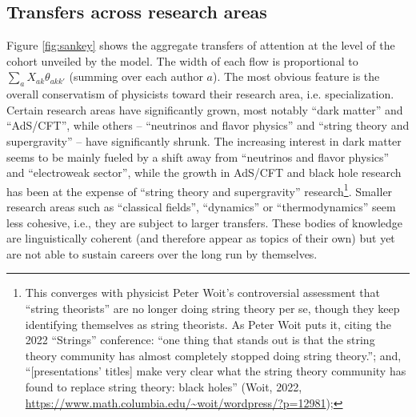 \documentclass{article}
\begin{document}
 \subsection{\label{sec:macro}Transfers across research areas}

Figure \ref{fig:sankey} shows the aggregate transfers of attention at the level of the cohort unveiled by the model. The width of each flow is proportional to $\sum_a X_{ak}\theta_{akk'}$ (summing over each author $a$). The most obvious feature is the overall conservatism of physicists toward their research area, i.e. specialization. Certain research areas have significantly grown, most notably ``dark matter'' and ``AdS/CFT'', while others --  ``neutrinos and flavor physics'' and ``string theory and supergravity'' -- have significantly shrunk. %
The increasing interest in dark matter seems to be mainly fueled by a shift away from ``neutrinos and flavor physics'' and ``electroweak sector'', while the growth in AdS/CFT and black hole research has been at the expense of ``string theory and supergravity'' research\footnote{This converges with physicist Peter Woit's controversial assessment that ``string theorists'' are no longer doing string theory per se, though they keep identifying themselves as string theorists. As Peter Woit puts it, citing the 2022 ``Strings'' conference: ``one thing that stands out is that the string theory community has almost completely stopped doing string theory.''; and, ``[presentations' titles] make very clear what the string theory community has found to replace string theory: black holes'' (Woit, 2022, \url{https://www.math.columbia.edu/~woit/wordpress/?p=12981});}. Smaller research areas such as ``classical fields'', ``dynamics'' or ``thermodynamics'' seem less cohesive, i.e., they are subject to larger transfers. These bodies of knowledge are linguistically coherent (and therefore appear as topics of their own) but yet are not able to sustain careers over the long run by themselves.
\end{document}

